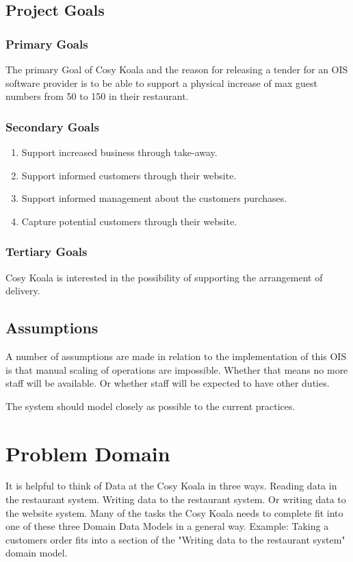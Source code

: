 \documentclass{article}
\begin{document}
\subsection{Project Goals}
\subsubsection{Primary Goals}
The primary Goal of Cosy Koala and the reason for releasing a tender for an OIS software provider is to be able to support a physical increase of max guest numbers from 50 to 150 in their restaurant.
\subsubsection{Secondary Goals}
\begin{enumerate}
    \item Support increased business through take-away.
    \item Support informed customers through their website.
    \item Support informed management about the customers purchases.
    \item Capture potential customers through their website.
\end{enumerate}
\subsubsection{Tertiary Goals}
Cosy Koala is interested in the possibility of supporting the arrangement of delivery.

\subsection{Assumptions}
A number of assumptions are made in relation to the implementation of this OIS is that manual scaling of operations are impossible. Whether that means no more staff will be available. Or whether staff will be expected to have other duties.

The system should model closely as possible to the current practices.


\clearpage

\section{Problem Domain}
It is helpful to think of Data at the Cosy Koala in three ways. Reading data in the restaurant system. Writing data to the restaurant system. Or writing data to the website system. 
Many of the tasks the Cosy Koala needs to complete fit into one of these three Domain Data Models in a general way. 
Example: Taking a customers order fits into a section of the "Writing data to the restaurant system" domain model.
\end{document}
